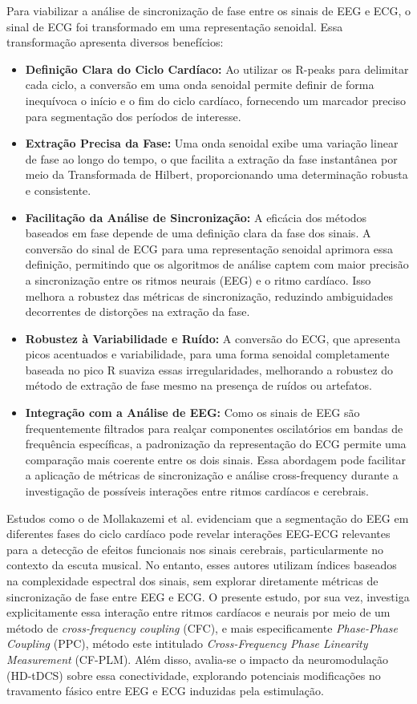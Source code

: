 Para viabilizar a análise de sincronização de fase entre os sinais de EEG e ECG, o sinal de ECG foi transformado em uma representação senoidal. Essa transformação apresenta diversos benefícios:
\begin{itemize}
    \item \textbf{Definição Clara do Ciclo Cardíaco:} Ao utilizar os R-peaks para delimitar cada ciclo, a conversão em uma onda senoidal permite definir de forma inequívoca o início e o fim do ciclo cardíaco, fornecendo um marcador preciso para segmentação dos períodos de interesse.
    \item \textbf{Extração Precisa da Fase:} Uma onda senoidal exibe uma variação linear de fase ao longo do tempo, o que facilita a extração da fase instantânea por meio da Transformada de Hilbert, proporcionando uma determinação robusta e consistente.
    \item \textbf{Facilitação da Análise de Sincronização:} A eficácia dos métodos baseados em fase depende de uma definição clara da fase dos sinais. A conversão do sinal de ECG para uma representação senoidal aprimora essa definição, permitindo que os algoritmos de análise captem com maior precisão a sincronização entre os ritmos neurais (EEG) e o ritmo cardíaco. Isso melhora a robustez das métricas de sincronização, reduzindo ambiguidades decorrentes de distorções na extração da fase.
    \item \textbf{Robustez à Variabilidade e Ruído:} A conversão do ECG, que apresenta picos acentuados e variabilidade, para uma forma senoidal completamente baseada no pico R suaviza essas irregularidades, melhorando a robustez do método de extração de fase mesmo na presença de ruídos ou artefatos.
    \item \textbf{Integração com a Análise de EEG:} Como os sinais de EEG são frequentemente filtrados para realçar componentes oscilatórios em bandas de frequência específicas, a padronização da representação do ECG permite uma comparação mais coerente entre os dois sinais. Essa abordagem pode facilitar a aplicação de métricas de sincronização e análise cross-frequency durante a investigação de possíveis interações entre ritmos cardíacos e cerebrais.
\end{itemize}

Estudos como o de Mollakazemi et al. \cite{mollakazemi2021eeg} evidenciam que a segmentação do EEG em diferentes fases do ciclo cardíaco pode revelar interações EEG-ECG relevantes para a detecção de efeitos funcionais nos sinais cerebrais, particularmente no contexto da escuta musical. No entanto, esses autores utilizam índices baseados na complexidade espectral dos sinais, sem explorar diretamente métricas de sincronização de fase entre EEG e ECG. O presente estudo, por sua vez, investiga explicitamente essa interação entre ritmos cardíacos e neurais por meio de um método de \textit{cross-frequency coupling} (CFC), e mais especificamente \textit{Phase-Phase Coupling} (PPC), método este intitulado \textit{Cross-Frequency Phase Linearity Measurement} (CF-PLM). Além disso, avalia-se o impacto da neuromodulação (HD-tDCS) sobre essa conectividade, explorando potenciais modificações no travamento fásico entre EEG e ECG induzidas pela estimulação.


